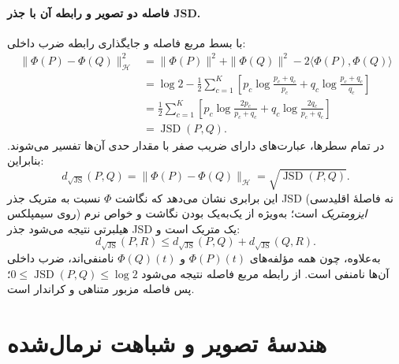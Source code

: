 \paragraph{فاصله دو تصویر و رابطه آن با جذر JSD.}
با بسط مربع فاصله و جایگذاری رابطه ضرب داخلی:
\begin{equation}\label{cmp:eq:ch3-js-Hilbert-metric}
\begin{aligned}
\|\Phi(P)-\Phi(Q)\|_{\mathcal H}^2
&=\|\Phi(P)\|^2+\|\Phi(Q)\|^2
-2\langle\Phi(P),\Phi(Q)\rangle\\
&=\log2-\frac12\sum_{c=1}^{K}
\left[
p_c\log\frac{p_c+q_c}{p_c}
+q_c\log\frac{p_c+q_c}{q_c}
\right]\\
&=\frac12\sum_{c=1}^{K}\left[
p_c\log\frac{2p_c}{p_c+q_c}
+q_c\log\frac{2q_c}{p_c+q_c}
\right]\\
&=\operatorname{JSD}(P,Q).
\end{aligned}
\end{equation}
در تمام سطرها، عبارت‌های دارای ضریب صفر با مقدار حدی آن‌ها تفسیر می‌شوند. بنابراین:
\begin{equation}\label{cmp:eq:ch3-js-distance}
\boxed{
d_{\sqrt{\mathrm{JS}}}(P,Q)=\|\Phi(P)-\Phi(Q)\|_{\mathcal H}
=\sqrt{\operatorname{JSD}(P,Q)}.
}
\end{equation}
این برابری نشان می‌دهد که نگاشت $\Phi$ نسبت به متریک جذر JSD (نه فاصلهٔ اقلیدسی روی سیمپلکس) \emph{ایزومتریک} است؛ به‌ویژه از یک‌به‌یک بودن نگاشت و خواص نرم هیلبرتی نتیجه می‌شود جذر JSD یک متریک است و:
\begin{equation}\label{eq:app-ch3-js-triangle}
d_{\sqrt{\mathrm{JS}}}(P,R)\le
d_{\sqrt{\mathrm{JS}}}(P,Q)+d_{\sqrt{\mathrm{JS}}}(Q,R).
\end{equation}
به‌علاوه، چون همه مؤلفه‌های $\Phi(P)(t)$ و $\Phi(Q)(t)$ نامنفی‌اند، ضرب داخلی آن‌ها نامنفی است. از رابطه مربع فاصله نتیجه می‌شود
$0\le\operatorname{JSD}(P,Q)\le\log2$؛
پس فاصله مزبور متناهی و کراندار است.

\section{هندسهٔ تصویر و شباهت نرمال‌شده}
